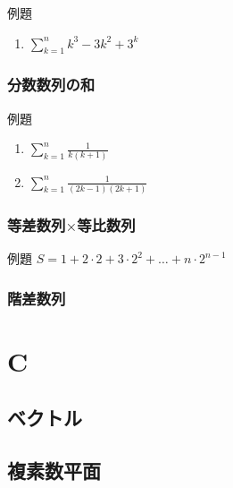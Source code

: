 \documentclass[10pt,dvipdfmx]{jsarticle}
\begin{document}
\begin{itembox}[l]{例題}
  \begin{large}
    \begin{enumerate}
      \item $\sum_{k=1}^{n}k^3-3k^2+3^k$
    \end{enumerate}
  \end{large}
\end{itembox}

\subsubsection*{分数数列の和}
\begin{itembox}[l]{例題}
  \begin{LARGE}
    \begin{enumerate}
      \item $\sum_{k=1}^{n}\frac{1}{k(k+1)}$
      \item $\sum_{k=1}^{n}\frac{1}{(2k-1)(2k+1)}$
    \end{enumerate}
  \end{LARGE}
\end{itembox}

\subsubsection*{等差数列$\times$等比数列}
\begin{itembox}[l]{例題}
  $S=1+2\cdot2+3\cdot2^2+\dots+n\cdot2^{n-1}$
  \vspace{20mm}
\end{itembox}

\subsubsection*{階差数列}


\section*{C}
\subsection*{ベクトル}
\subsection*{複素数平面}
\end{document}
